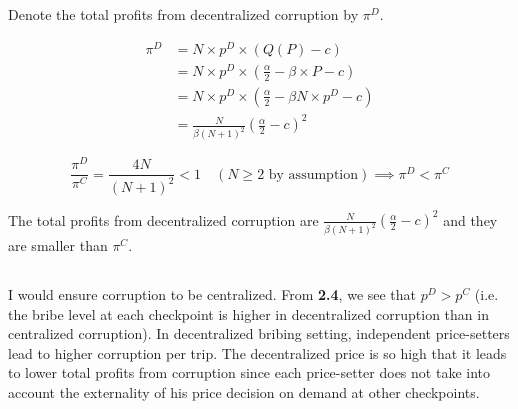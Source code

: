 \documentclass[a4paper]{article}
\begin{document}
Denote the total profits from decentralized corruption by $\pi^D$.

\begin{align*}
    \pi^D&=N\times p^D \times (Q(P)-c) \\
    &=N\times p^D \times \left(\frac{\alpha}{2}-\beta\times P-c \right) \\
    &=N\times p^D \times \left(\frac{\alpha}{2}-\beta N\times p^D-c \right) \\
    &=\frac{N}{\beta(N+1)^2}\left(\frac{\alpha}{2}-c \right)^2
\end{align*}

\begin{equation*}
    \frac{\pi^D}{\pi^C}=\frac{4N}{(N+1)^2}<1 \quad (N\geq 2\text{ by assumption})\implies \pi^D<\pi^C
\end{equation*}

The total profits from decentralized corruption are $\frac{N}{\beta(N+1)^2}\left(\frac{\alpha}{2}-c \right)^2$ and they are smaller than $\pi^C$.

\subsection{}

I would ensure corruption to be centralized. From \textbf{2.4}, we see that $p^D>p^C$ (i.e. the bribe level at each checkpoint is higher in decentralized corruption than in centralized corruption). In decentralized bribing setting, independent price-setters lead to higher corruption per trip. The decentralized price is so high that it leads to lower total profits from corruption since each price-setter does not take into account the externality of his price decision on demand at other checkpoints.
\end{document}
